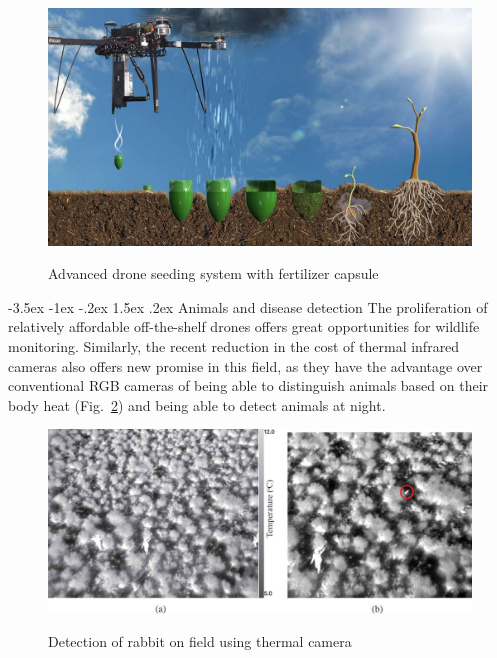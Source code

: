 \documentclass[a4paper,10pt]{article}
\makeatletter
\theoremstyle{definition}
\renewcommand\subsection{\@startsection {subsection}{1}{\z@}%
                                   {-3.5ex \@plus -1ex \@minus -.2ex}%
                                   {1.5ex \@plus.2ex}%
                                   {\normalsize\bfseries}}
\makeatother
\begin{document}
\begin{figure}[h]
\begin{center}
\includegraphics[scale=0.3]{images/Biodegradable-seedpods.jpg}
\caption{Advanced drone seeding system with fertilizer capsule}\cite{doi:10.1080/00380768.2020.1738899}
\label{fig:4}
\end{center}
\end{figure}

\subsection{Animals and disease detection}
\label{subsec:4}
 The proliferation of relatively affordable off-the-shelf drones offers great opportunities for wildlife monitoring. Similarly, the recent reduction in the cost of thermal infrared cameras also offers new promise in this field, as they have the advantage over conventional RGB cameras of being able to distinguish animals based on their body heat (Fig.~\ref{fig:5}) and being able to detect animals at night.
\cite{animals_drone}

\begin{figure}[h]
\begin{center}
\includegraphics[scale=0.35]{images/tres_a_1558372_f0011_c.jpeg}
\caption{Detection of rabbit on field using thermal camera}\cite{animals_drone}
\label{fig:5}
\end{center}
\end{figure}
\end{document}
